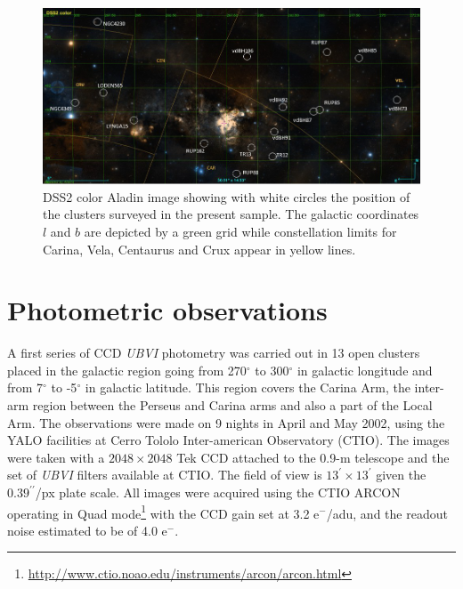 \documentclass[draft]{aa}
\begin{document}
\begin{figure}[ht]
    \centering
    \includegraphics[width=\hsize]{../figs/DSS2color.png}
    \caption{DSS2 color Aladin image showing with white circles the position of
    the clusters surveyed in the present sample. The galactic coordinates $l$
    and $b$ are depicted by a green grid while constellation limits for Carina,
    Vela, Centaurus and Crux appear in yellow lines.}
    \label{fig1}
\end{figure}




\section{Photometric observations}
\label{sec:photo_obs}

A first series of CCD \emph{UBVI} photometry was carried out in 13 open clusters
placed in the galactic region going from 270$^\circ$ to 300$^\circ$ in galactic
longitude and from 7$^\circ$ to -5$^\circ$ in galactic latitude. This region
covers the Carina Arm, the inter-arm region between the Perseus and Carina arms
and also a part of the Local Arm.
%
The observations were made on 9 nights in April and May 2002, using the YALO
facilities at Cerro Tololo Inter-american Observatory (CTIO). The images were
taken with a $2048\times2048$ Tek CCD attached to the 0.9-m telescope and the
set of \textit{UBVI} filters available at CTIO. The field of view is
$13^\prime\times13^\prime$ given the $0.39^{\prime\prime}$/px plate scale.
All images were acquired using the CTIO ARCON operating in Quad
mode\footnote{\url{http://www.ctio.noao.edu/instruments/arcon/arcon.html}} with
the CCD gain set at 3.2 e$^-$/adu, and the readout noise estimated to be of
4.0 e$^-$.
\end{document}
